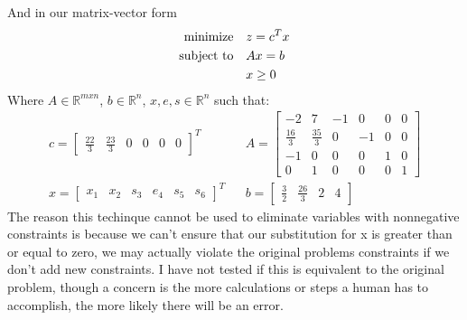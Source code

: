 \documentclass{article}
\begin{document}
And in our matrix-vector form
\begin{align*}
    \text{minimize} &\null \quad z = c^Tx \\
    \text{subject to} &\null \quad Ax=b \\
    & \quad x \geq 0
\end{align*}
Where $A \in \mathbb{R}^{mxn}$, $b \in \mathbb{R}^n$, $x, e, s \in \mathbb{R}^n$ such that:  
\begin{align*}c =
    \begin{bmatrix}
        \frac{22}{3} & \frac{23}{3} & 0 & 0 & 0 & 0
    \end{bmatrix}^T && A =
    \begin{bmatrix}
        -2 & 7 & -1 & 0 & 0 & 0 \\
        \frac{16}{3} & \frac{35}{3} & 0 & -1 & 0 & 0 \\
        -1 & 0 & 0 & 0 & 1 & 0 \\
        0 & 1 & 0 & 0 & 0 & 1
    \end{bmatrix} \\ x =
    \begin{bmatrix}
        x_1 & x_2 & s_3 & e_4 & s_5 & s_6
    \end{bmatrix}^T && b =
    \begin{bmatrix}
        \frac{3}{2} & \frac{26}{3} & 2 & 4
    \end{bmatrix}
\end{align*}
The reason this techinque cannot be used to eliminate variables with nonnegative constraints is because we can't ensure that our substitution for x is greater than or equal to zero, we may actually violate the original problems constraints if we don't add new constraints. I have not tested if this is equivalent to the original problem, though a concern is the more calculations or steps a human has to accomplish, the more likely there will be an error.
\end{document}
